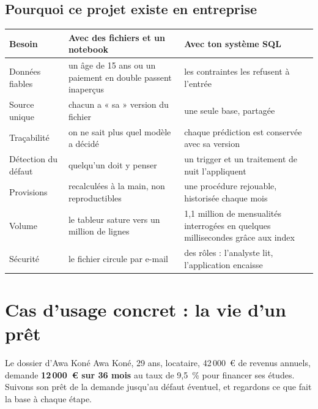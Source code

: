 \subsection{Pourquoi ce projet existe en entreprise}

\begin{center}\small
\begin{tabularx}{\linewidth}{@{}B{3.1cm} L L@{}}
\toprule
Besoin & Avec des fichiers et un notebook & Avec ton système SQL \\
\midrule
Données fiables & un âge de 15 ans ou un paiement en double passent inaperçus & les contraintes les
refusent à l'entrée \\
Source unique & chacun a « sa » version du fichier & une seule base, partagée \\
Traçabilité & on ne sait plus quel modèle a décidé & chaque prédiction est conservée avec sa version \\
Détection du défaut & quelqu'un doit y penser & un trigger et un traitement de nuit l'appliquent \\
Provisions & recalculées à la main, non reproductibles & une procédure rejouable, historisée chaque mois \\
Volume & le tableur sature vers un million de lignes & 1,1 million de mensualités interrogées en
quelques millisecondes grâce aux index \\
Sécurité & le fichier circule par e-mail & des rôles : l'analyste lit, l'application encaisse \\
\bottomrule
\end{tabularx}
\end{center}

\section{Cas d'usage concret : la vie d'un prêt}

\begin{situation}{Le dossier d'Awa Koné}
Awa Koné, 29 ans, locataire, 42\,000~€ de revenus annuels, demande \textbf{12\,000~€ sur 36 mois} au
taux de 9,5~\% pour financer ses études. Suivons son prêt de la demande jusqu'au défaut éventuel, et
regardons ce que fait la base à chaque étape.
\end{situation}

